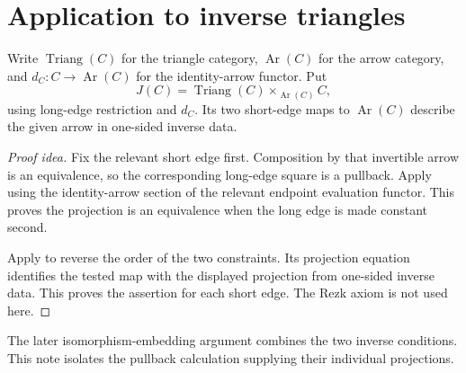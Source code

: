 \documentclass[11pt]{article}
\begin{document}
\section*{Application to inverse triangles}

Write $\operatorname{Triang}(C)$ for the triangle category,
$\operatorname{Ar}(C)$ for the arrow category, and $d_C\colon C\to
\operatorname{Ar}(C)$ for the identity-arrow functor. Put
\[
 J(C)=\operatorname{Triang}(C)\times_{\operatorname{Ar}(C)} C,
\]
using long-edge restriction and $d_C$. Its two short-edge maps to
$\operatorname{Ar}(C)$ describe the given arrow in one-sided inverse data.

\begin{proof}[Proof idea]
Fix the relevant short edge first. Composition by that invertible arrow
is an equivalence, so the corresponding long-edge square is a pullback.
Apply  using the identity-arrow
section of the relevant endpoint evaluation functor. This proves the
projection is an equivalence when the long edge is made constant second.

Apply  to reverse the order of
the two constraints. Its projection equation identifies the tested map
with the displayed projection from one-sided inverse data. This proves
the assertion for each short edge. The Rezk axiom is not used here.
\end{proof}

The later isomorphism-embedding argument combines the two inverse
conditions. This note isolates the pullback calculation supplying their
individual projections.
\end{document}
